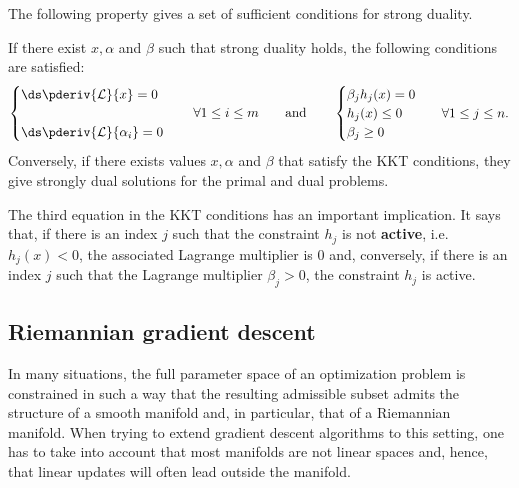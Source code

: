     The following property gives a set of sufficient conditions for strong duality.
    \begin{property}\label{data:kkt}
        If there exist $x,\alpha$ and $\beta$ such that strong duality holds, the following conditions are satisfied:
        \begin{align}
            \begin{cases}
                \ds\pderiv{\mathcal{L}}{x}=0\\
                \\
                \ds\pderiv{\mathcal{L}}{\alpha_i}=0
            \end{cases}
            \quad\forall1\leq i\leq m \qquad\text{and}\qquad
            \begin{cases}
                \beta_jh_j(x)=0\\
                h_j(x)\leq0&\quad\forall1\leq j\leq n.\\
                \beta_j\geq0
            \end{cases}
        \end{align}
        Conversely, if there exists values $x,\alpha$ and $\beta$ that satisfy the KKT conditions, they give strongly dual solutions for the primal and dual problems.
    \end{property}
    \begin{remark}\label{data:slackness}
        The third equation in the KKT conditions has an important implication. It says that, if there is an index $j$ such that the constraint $h_j$ is not \textbf{active}, i.e.~$h_j(x)<0$, the associated Lagrange multiplier is 0 and, conversely, if there is an index $j$ such that the Lagrange multiplier $\beta_j>0$, the constraint $h_j$ is active.
    \end{remark}


\subsection{Riemannian gradient descent}

    In many situations, the full parameter space of an optimization problem is constrained in such a way that the resulting admissible subset admits the structure of a smooth manifold and, in particular, that of a Riemannian manifold. When trying to extend gradient descent algorithms to this setting, one has to take into account that most manifolds are not linear spaces and, hence, that linear updates will often lead outside the manifold.

